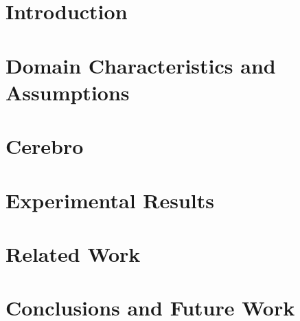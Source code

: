 \section{Introduction}
\label{sec:cerbro_intro}


\section{Domain Characteristics and Assumptions}
\label{sec:cerebro_approach}



\section{Cerebro}
\label{sec:cerebro_design}


\section{Experimental Results}
\label{sec:cerebro_results}


\section{Related Work}
\label{sec:cerebro_related_work}


\section{Conclusions and Future Work}
\label{sec:cerebro_conclusions}

